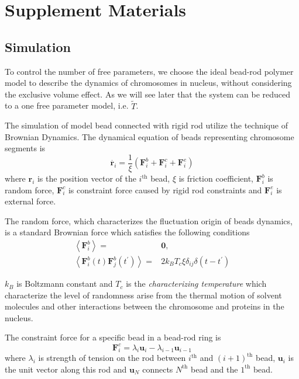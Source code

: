 \documentclass{article}
\begin{document}
\section{Supplement Materials}


\subsection{Simulation}
\label{sub:simulation}
To control the number of free parameters, we choose the ideal bead-rod polymer model to describe the dynamics of chromosomes in nucleus, without considering the exclusive volume effect. 
As we will see later that the system can be reduced to a one free parameter model, i.e. $\tilde{T}$. 

The simulation of model bead connected with rigid rod utilize the technique of Brownian Dynamics\cite{Cruz2012}.
The dynamical equation of beads representing chromosome segments is
\begin{equation}
	\label{eq:differential}
	\dot{\mathbf{r}_i} = \frac{1}{\xi}(\mathbf{F}_i^b + \mathbf{F}_i^c + \mathbf{F}_i^e) 
\end{equation}
where $\mathbf{r}_i$ is the position vector of the $i^{\text{th}}$ bead, $\xi$ is friction coefficient, $\mathbf{F}_i^b$ is random force, $\mathbf{F}_i^c$ is constraint force caused by rigid rod constraints and $\mathbf{F}_i^e$ is external force.

The random force, which characterizes the fluctuation origin of beads dynamics, is a standard Brownian force which satisfies the following conditions
\begin{subequations}
	\begin{align}
		\left\langle\mathbf{F}_i^b\right\rangle=& \mathbf{0}, \\
		\left\langle\mathbf{F}_i^b (t)\mathbf{F}_j^b (t^{\prime}) \right\rangle=&2k_B T_{c} \xi\delta_{ij}\delta(t-t^{\prime})
	\end{align}
\end{subequations}

$k_B$ is Boltzmann constant and $T_{c}$ is the \emph{characterizing temperature} which characterize the level of randomness arise from the thermal motion of solvent molecules and other interactions between the chromosome and proteins in the nucleus.

The constraint force for a specific bead in a bead-rod ring is
\begin{equation}
	\mathbf{F}_i^c = \lambda_i \mathbf{u}_i - \lambda_{i-1} \mathbf{u}_{i-1}
\end{equation}
where $\lambda_i$ is strength of tension on the rod between $i^{\text{th}}$ and $(i+1)^{\text{th}}$ bead, $\mathbf{u}_i$ is the unit vector along this rod and $\mathbf{u}_{N}$ connects $N^{\text{th}}$ bead and the $1^{\text{th}}$ bead. 
\end{document}
